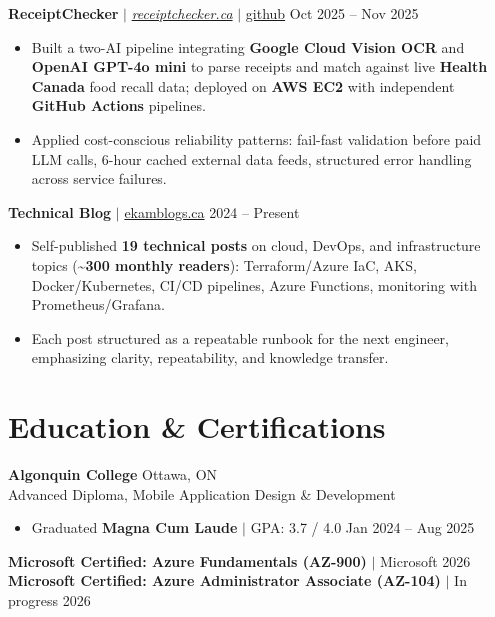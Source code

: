 \documentclass[11pt,a4paper]{article}
\begin{document}
\vspace{4pt}

\textbf{ReceiptChecker} $|$ \href{https://receiptchecker.ca/}{\emph{receiptchecker.ca}} $|$ \href{https://github.com/bhat0155/receipt-check}{\small github} \hfill Oct 2025 -- Nov 2025
\begin{itemize}
    \item Built a two-AI pipeline integrating \textbf{Google Cloud Vision OCR} and \textbf{OpenAI GPT-4o mini} to parse receipts and match against live \textbf{Health Canada} food recall data; deployed on \textbf{AWS EC2} with independent \textbf{GitHub Actions} pipelines.
    \item Applied cost-conscious reliability patterns: fail-fast validation before paid LLM calls, 6-hour cached external data feeds, structured error handling across service failures.
\end{itemize}

\vspace{4pt}

\textbf{Technical Blog} $|$ \href{https://www.ekamblogs.ca}{ekamblogs.ca} \hfill 2024 -- Present
\begin{itemize}
    \item Self-published \textbf{19 technical posts} on cloud, DevOps, and infrastructure topics (\textasciitilde\textbf{300 monthly readers}): Terraform/Azure IaC, AKS, Docker/Kubernetes, CI/CD pipelines, Azure Functions, monitoring with Prometheus/Grafana.
    \item Each post structured as a repeatable runbook for the next engineer, emphasizing clarity, repeatability, and knowledge transfer.
\end{itemize}

\section{Education \& Certifications}

\textbf{Algonquin College} \hfill Ottawa, ON \\
Advanced Diploma, Mobile Application Design \& Development
\begin{itemize}
    \item Graduated \textbf{Magna Cum Laude} $|$ GPA: 3.7 / 4.0 \hfill Jan 2024 -- Aug 2025
\end{itemize}
\textbf{Microsoft Certified: Azure Fundamentals (AZ-900)} $|$ Microsoft \hfill 2026 \\
\textbf{Microsoft Certified: Azure Administrator Associate (AZ-104)} $|$ In progress \hfill 2026
\end{document}
